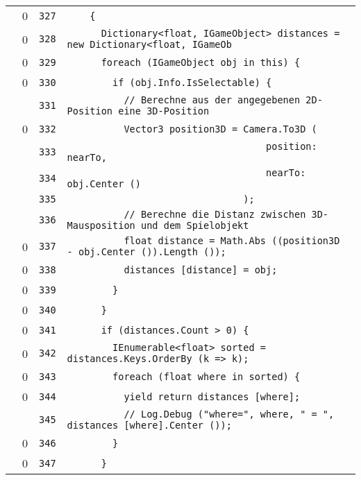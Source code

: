 \documentclass[a4paper,10pt]{article}
\begin{document}
\begin{longtable}[l]{lrrl}
\cellcolor{red} & 0 & \verb~327~ & \verb~    {~\\
\cellcolor{red} & 0 & \verb~328~ & \verb~      Dictionary<float, IGameObject> distances = new Dictionary<float, IGameOb~\\
\cellcolor{red} & 0 & \verb~329~ & \verb~      foreach (IGameObject obj in this) {~\\
\cellcolor{red} & 0 & \verb~330~ & \verb~        if (obj.Info.IsSelectable) {~\\
\cellcolor{gray} &  & \verb~331~ & \verb~          // Berechne aus der angegebenen 2D-Position eine 3D-Position~\\
\cellcolor{red} & 0 & \verb~332~ & \verb~          Vector3 position3D = Camera.To3D (~\\
\cellcolor{gray} &  & \verb~333~ & \verb~                                   position: nearTo,~\\
\cellcolor{gray} &  & \verb~334~ & \verb~                                   nearTo: obj.Center ()~\\
\cellcolor{gray} &  & \verb~335~ & \verb~                               );~\\
\cellcolor{gray} &  & \verb~336~ & \verb~          // Berechne die Distanz zwischen 3D-Mausposition und dem Spielobjekt~\\
\cellcolor{red} & 0 & \verb~337~ & \verb~          float distance = Math.Abs ((position3D - obj.Center ()).Length ());~\\
\cellcolor{red} & 0 & \verb~338~ & \verb~          distances [distance] = obj;~\\
\cellcolor{red} & 0 & \verb~339~ & \verb~        }~\\
\cellcolor{red} & 0 & \verb~340~ & \verb~      }~\\
\cellcolor{red} & 0 & \verb~341~ & \verb~      if (distances.Count > 0) {~\\
\cellcolor{red} & 0 & \verb~342~ & \verb~        IEnumerable<float> sorted = distances.Keys.OrderBy (k => k);~\\
\cellcolor{red} & 0 & \verb~343~ & \verb~        foreach (float where in sorted) {~\\
\cellcolor{red} & 0 & \verb~344~ & \verb~          yield return distances [where];~\\
\cellcolor{gray} &  & \verb~345~ & \verb~          // Log.Debug ("where=", where, " = ", distances [where].Center ());~\\
\cellcolor{red} & 0 & \verb~346~ & \verb~        }~\\
\cellcolor{red} & 0 & \verb~347~ & \verb~      }~\\

\end{longtable}
\end{document}

